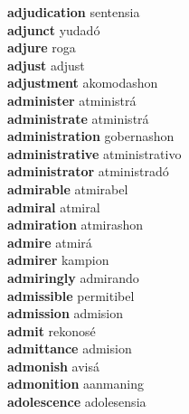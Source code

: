 \textbf{adjudication } sentensia \\
\textbf{adjunct } yudadó \\
\textbf{adjure } roga \\
\textbf{adjust } adjust \\
\textbf{adjustment } akomodashon \\
\textbf{administer } atministrá \\
\textbf{administrate } atministrá \\
\textbf{administration } gobernashon \\
\textbf{administrative } atministrativo \\
\textbf{administrator } atministradó \\
\textbf{admirable } atmirabel \\
\textbf{admiral } atmiral \\
\textbf{admiration } atmirashon \\
\textbf{admire } atmirá \\
\textbf{admirer } kampion \\
\textbf{admiringly } admirando \\
\textbf{admissible } permitibel \\
\textbf{admission } admision \\
\textbf{admit } rekonosé \\
\textbf{admittance } admision \\
\textbf{admonish } avisá \\
\textbf{admonition } aanmaning \\
\textbf{adolescence } adolesensia \\
